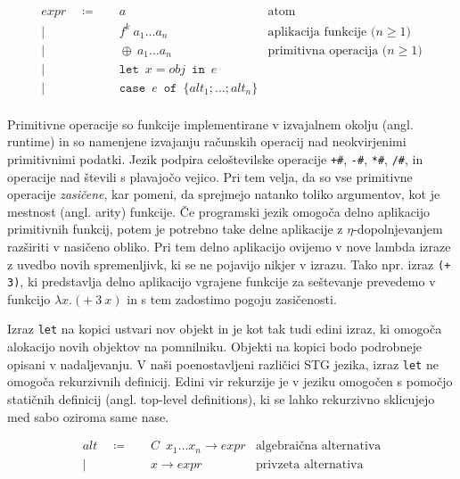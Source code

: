 \begin{align*}
	expr \quad \coloneq& \quad a & \text{atom}\\
	\vert& \quad f^k \: a_1 \dots a_n & \text{aplikacija funkcije ($n \geq 1$)}\\
	\vert& \quad \oplus \: a_1 \dots a_n & \text{primitivna operacija ($n \geq 1$)}\\
	\vert& \quad \texttt{let} \enspace x = obj \enspace \texttt{in} \enspace e & \text{} \\
	\vert& \quad \texttt{case} \enspace e \enspace \texttt{of} \enspace \{ alt_1; \dots; alt_n \}& \text{} \\
\end{align*}

Primitivne operacije so funkcije implementirane v izvajalnem okolju (angl. runtime) in so namenjene izvajanju računskih operacij nad neokvirjenimi primitivnimi podatki. Jezik podpira celoštevilske operacije \texttt{+\#}, \texttt{-\#}, \texttt{*\#}, \texttt{/\#}, in operacije nad števili s plavajočo vejico. Pri tem velja, da so vse primitivne operacije \textit{zasičene}, kar pomeni, da sprejmejo natanko toliko argumentov, kot je mestnost (angl. arity) funkcije. Če programski jezik omogoča delno aplikacijo primitivnih funkcij, potem je potrebno take delne aplikacije z $\eta$-dopolnjevanjem razširiti v nasičeno obliko. Pri tem delno aplikacijo ovijemo v nove lambda izraze z uvedbo novih spremenljivk, ki se ne pojavijo nikjer v izrazu. Tako npr. izraz \texttt{(+ 3)}, ki predstavlja delno aplikacijo vgrajene funkcije za seštevanje prevedemo v funkcijo $\lambda x . (+ \: 3 \: x)$ in s tem zadostimo pogoju zasičenosti.

Izraz \texttt{let} na kopici ustvari nov objekt in je kot tak tudi edini izraz, ki omogoča alokacijo novih objektov na pomnilniku. Objekti na kopici bodo podrobneje opisani v nadaljevanju. V naši poenostavljeni različici STG jezika, izraz \texttt{let} ne omogoča rekurzivnih definicij. Edini vir rekurzije je v jeziku omogočen s pomočjo statičnih definicij (angl. top-level definitions), ki se lahko rekurzivno sklicujejo med sabo oziroma same nase.

\begin{align*}
	alt \quad \coloneq& \quad C \enspace x_1 \dots x_n \to expr & \text{algebraična alternativa}\\
	\vert& \quad x \to expr & \text{privzeta alternativa}\\
\end{align*}

